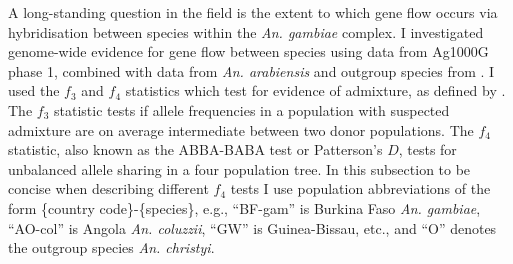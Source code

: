 \begin{refsection}


A long-standing question in the field is the extent to which gene flow occurs via hybridisation between species within the \textit{An. gambiae} complex.
%
I investigated genome-wide evidence for gene flow between species using data from Ag1000G phase 1, combined with data from \textit{An. arabiensis} and outgroup species from \textcite{Neafsey2015}.
%
I used the $f_3$ and $f_4$ statistics which test for evidence of admixture, as defined by \textcite{Patterson2012}.
%
The $f_3$ statistic tests if allele frequencies in a population with suspected admixture are on average intermediate between two donor populations.
%
The $f_4$ statistic, also known as the ABBA-BABA test or Patterson's $D$, tests for unbalanced allele sharing in a four population tree.
%
In this subsection to be concise when describing different $f_4$ tests I use population abbreviations of the form \{country code\}-\{species\}, e.g., ``BF-gam'' is Burkina Faso \textit{An. gambiae}, ``AO-col'' is Angola \textit{An. coluzzii}, ``GW'' is Guinea-Bissau, etc., and ``O'' denotes the outgroup species \textit{An. christyi}.



\end{refsection}

